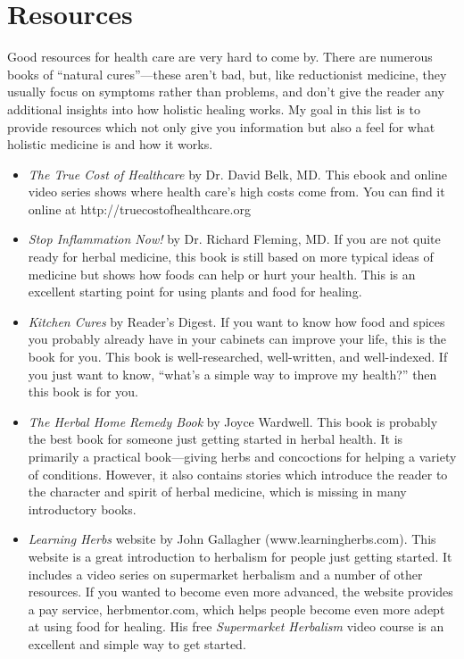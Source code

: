 \section{Resources}

Good resources for health care are very hard to come by.  There are numerous
books of ``natural cures''---these aren't bad, but, like reductionist medicine, 
they usually focus on symptoms rather than problems, and don't give the 
reader any additional insights into how holistic healing works.  My goal in 
this list is to provide resources which not only give you information but also 
a feel for what holistic medicine is and how it works.

\begin{itemize}
\item 
\textit{The True Cost of Healthcare} by Dr. David Belk, MD.  This ebook and online
video series shows where health care's high costs come from.  You can find it online
at http://truecostofhealthcare.org
\item 
\textit{Stop Inflammation Now!} by Dr. Richard Fleming, MD. If you are not quite
ready for herbal medicine, this book is still based on more typical
ideas of medicine but shows how foods can help or hurt your health.
This is an excellent starting point for using plants and food for
healing.
\item
\textit{Kitchen Cures} by Reader's Digest.  If you want to know how food and spices
you probably already have in your cabinets can improve your life, this is the book
for you.  This book is well-researched, well-written, and well-indexed.  If you 
just want to know, ``what's a simple way to improve my health?'' then this book
is for you. 
\item 
\textit{The Herbal Home Remedy Book} by Joyce Wardwell. This book is
probably the best book for someone just getting started in herbal
health. It is primarily a practical book—giving herbs and concoctions
for helping a variety of conditions. However, it also contains stories
which introduce the reader to the character and spirit of herbal
medicine, which is missing in many introductory books.
\item 
\textit{Learning Herbs} website by John Gallagher
(www.learningherbs.com). This website is a great introduction to
herbalism for people just getting started. It includes a video series
on supermarket herbalism and a number of other resources. If you wanted
to become even more advanced, the website provides a pay service,
herbmentor.com, which helps people become even more adept at using food
for healing.  His free \textit{Supermarket Herbalism} video course is
an excellent and simple way to get started.
\end{itemize}

